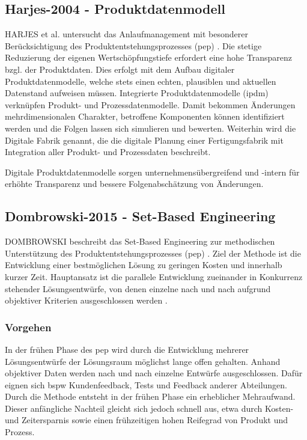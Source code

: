 \subsection*{Harjes-2004 - Produktdatenmodell}
HARJES et al. untersucht das Anlaufmanagement mit besonderer Berücksichtigung des Produktentstehungsprozesses (\gls{pep}) \autocite{Harjes2004}. 
Die stetige Reduzierung der eigenen Wertschöpfungstiefe erfordert eine hohe Transparenz bzgl. der Produktdaten. Dies erfolgt mit dem Aufbau digitaler Produktdatenmodelle, welche stets einen echten, plausiblen und aktuellen Datenstand aufweisen müssen. 
Integrierte Produktdatenmodelle (\gls{ipdm})
verknüpfen Produkt- und Prozessdatenmodelle. Damit bekommen Änderungen mehrdimensionalen Charakter, betroffene Komponenten können identifiziert werden und die Folgen lassen sich simulieren und bewerten. 
Weiterhin wird die Digitale Fabrik genannt, die die digitale Planung einer Fertigungsfabrik mit Integration aller Produkt- und Prozessdaten beschreibt. 

Digitale Produktdatenmodelle sorgen unternehmensübergreifend und -intern für erhöhte Transparenz und bessere Folgenabschätzung von Änderungen. 


\subsection*{Dombrowski-2015 - Set-Based Engineering}

DOMBROWSKI beschreibt das Set-Based Engineering zur methodischen Unterstützung des Produktentstehungsprozesses (\gls{pep}) \autocite[118]{Dombrowski2015}. %
Ziel der Methode ist die Entwicklung einer bestmöglichen Lösung zu geringen Kosten und innerhalb kurzer Zeit. 
Hauptansatz ist die parallele Entwicklung zueinander in Konkurrenz stehender Lösungsentwürfe, von denen einzelne nach und nach aufgrund objektiver Kriterien ausgeschlossen werden \autocite{Schuh2007}.

\subsubsection*{Vorgehen}
In der frühen Phase des \gls{pep} wird durch die Entwicklung mehrerer Lösungsentwürfe der Lösungsraum möglichst lange offen gehalten. Anhand objektiver Daten werden nach und nach einzelne Entwürfe ausgeschlossen. Dafür eignen sich \gls{bspw} Kundenfeedback, Tests und Feedback anderer Abteilungen. 
Durch die Methode entsteht in der frühen Phase ein erheblicher Mehraufwand. Dieser anfängliche Nachteil gleicht sich jedoch schnell aus, etwa durch Kosten- und Zeitersparnis sowie einen frühzeitigen hohen Reifegrad von Produkt und Prozess. 

